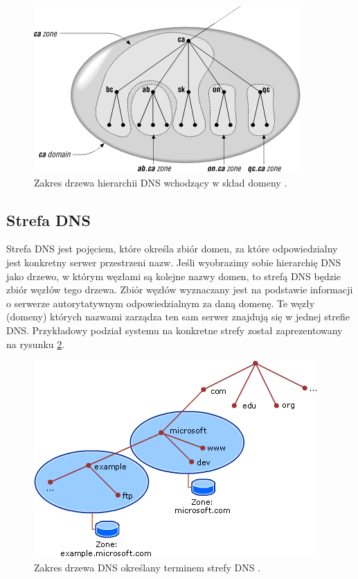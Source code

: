 \begin{center}
	\begin{figure}
	\includegraphics[scale=0.8]{image/domain_example}
	\caption{Zakres drzewa hierarchii DNS wchodzący w skład domeny \cite{domain_example}.}
	\label{fig:domain_dns_example}
	\end{figure}
\end{center}

\subsection{Strefa DNS}
Strefa DNS jest pojęciem, które określa zbiór domen, za które odpowiedzialny jest konkretny serwer przestrzeni nazw. Jeśli wyobrazimy
sobie hierarchię DNS jako drzewo, w którym węzłami są kolejne nazwy domen, to strefą DNS będzie zbiór węzłów tego drzewa. Zbiór
węzłów wyznaczany jest na podstawie informacji o serwerze autorytatywnym odpowiedzialnym za daną domenę. Te węzły (domeny)
których nazwami zarządza ten sam serwer znajdują się w jednej strefie DNS. Przykładowy podział systemu na konkretne strefy został
zaprezentowany na rysunku \ref{fig:dns_zone_example}.

\begin{center}
	\begin{figure}
	\includegraphics[scale=0.8]{image/zone_example}
	\caption{Zakres drzewa DNS określany terminem strefy DNS \cite{zone_example}.}
	\label{fig:dns_zone_example}
	\end{figure}
\end{center}

